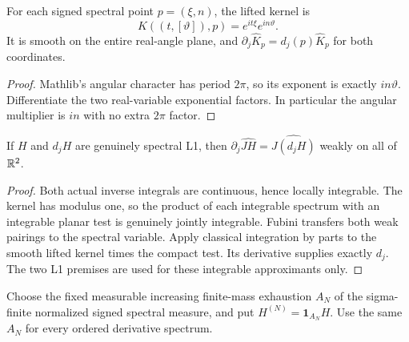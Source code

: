 \begin{lemma}
\label{lem:cylinder-kernel-derivative}
\leanok
For each signed spectral point $p=(\xi,n)$, the lifted kernel is
\[
 K((t,[\vartheta]),p)=e^{it\xi}e^{in\vartheta}.
\]
It is smooth on the entire real-angle plane, and
$\partial_j\widehat K_p=d_j(p)\widehat K_p$ for both coordinates.
\end{lemma}

\begin{proof}
\leanok
Mathlib's angular character has period $2\pi$, so its exponent is exactly
$in\vartheta$. Differentiate the two real-variable exponential factors.
In particular the angular multiplier is $in$ with no extra $2\pi$ factor.
\end{proof}

\begin{lemma}
\label{lem:cylinder-integral-weak-partial}
\leanok
If $H$ and $d_jH$ are genuinely spectral L1, then
$\partial_j\widehat{JH}=\widehat{J(d_jH)}$ weakly on all of $\mathbb{R}^2$.
\end{lemma}

\begin{proof}
\leanok
Both actual inverse integrals are continuous, hence locally integrable.
The kernel has modulus one, so the product of each integrable spectrum
with an integrable planar test is genuinely jointly integrable.
Fubini transfers both weak pairings to the spectral variable.
Apply classical integration by parts to the smooth lifted kernel times the
compact test. Its derivative supplies exactly $d_j$.
The two L1 premises are used for these integrable approximants only.
\end{proof}

\begin{definition}
\label{def:cylinder-spectral-cutoff}
\leanok
Choose the fixed measurable increasing finite-mass exhaustion $A_N$ of the
sigma-finite normalized signed spectral measure, and put
$H^{(N)}=\mathbf1_{A_N}H$.
Use the same $A_N$ for every ordered derivative spectrum.
\end{definition}

